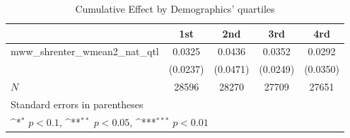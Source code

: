 \begin{table}[htbp]\centering
\def\sym#1{\ifmmode^{#1}\else\(^{#1}\)\fi}
\caption{Cumulative Effect by Demographics' quartiles}
\begin{tabular}{l*{4}{c}}
\hline\hline
            &\multicolumn{1}{c}{1st}&\multicolumn{1}{c}{2nd}&\multicolumn{1}{c}{3rd}&\multicolumn{1}{c}{4rd}\\
\hline
mww\_shrenter\_wmean2\_nat\_qtl&      0.0325         &      0.0436         &      0.0352         &      0.0292         \\
            &    (0.0237)         &    (0.0471)         &    (0.0249)         &    (0.0350)         \\
\hline
\(N\)       &       28596         &       28270         &       27709         &       27651         \\
\hline\hline
\multicolumn{5}{l}{\footnotesize Standard errors in parentheses}\\
\multicolumn{5}{l}{\footnotesize \sym{*} \(p<0.1\), \sym{**} \(p<0.05\), \sym{***} \(p<0.01\)}\\
\end{tabular}
\end{table}
